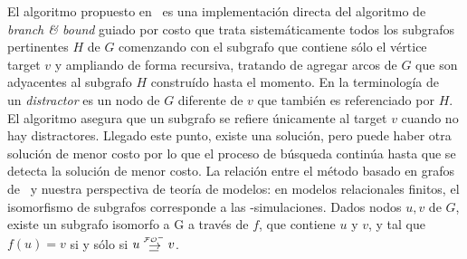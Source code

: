 El algoritmo propuesto en~\cite{Krahmer2003} es una
implementaci\'on directa del algoritmo de \emph{branch \& bound} guiado por costo que trata sistem\'aticamente todos los
subgrafos pertinentes $H$ de $G$ comenzando con el subgrafo
que contiene s\'olo el v\'ertice target $v$ y ampliando de forma recursiva, tratando de
agregar arcos de $G$ que son adyacentes al subgrafo $H$ constru\'ido
hasta el momento. En la terminolog\'ia de~\cite{Krahmer2003} un {\em distractor} es un nodo de $G$ diferente de
$v$ que tambi\'en es referenciado por $H$.
El algoritmo asegura que un subgrafo se refiere \'unicamente al target $v$ cuando no hay distractores. Llegado este punto, existe una
soluci\'on, pero puede haber otra
soluci\'on de menor costo por lo que el proceso de b\'usqueda contin\'ua hasta que
se detecta la soluci\'on de menor costo. 
La relaci\'on entre el m\'etodo basado en grafos
de~\cite{Krahmer2003} y nuestra perspectiva de teor\'ia de modelos: en
modelos relacionales finitos, el isomorfismo de subgrafos corresponde a las
\EPFOL-simulaciones. Dados nodos $u,v$ de
$G$, existe un subgrafo isomorfo a G a trav\'es de $f$, que contiene $ u $ y
$v$, y tal que $f(u)=v$ si y s\'olo si $u \simul{\+\EPFOL} v$.
%
%
